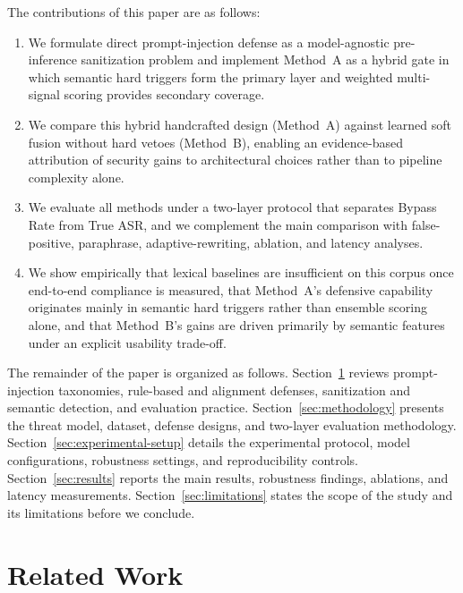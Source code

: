 \documentclass{article}
\begin{document}
The contributions of this paper are as follows:
\begin{enumerate}
  \item We formulate direct prompt-injection defense as a model-agnostic pre-inference sanitization problem and implement Method~A as a hybrid gate in which semantic hard triggers form the primary layer and weighted multi-signal scoring provides secondary coverage.
  \item We compare this hybrid handcrafted design (Method~A) against learned soft fusion without hard vetoes (Method~B), enabling an evidence-based attribution of security gains to architectural choices rather than to pipeline complexity alone.
  \item We evaluate all methods under a two-layer protocol that separates Bypass Rate from True ASR, and we complement the main comparison with false-positive, paraphrase, adaptive-rewriting, ablation, and latency analyses.
  \item We show empirically that lexical baselines are insufficient on this corpus once end-to-end compliance is measured, that Method~A's defensive capability originates mainly in semantic hard triggers rather than ensemble scoring alone, and that Method~B's gains are driven primarily by semantic features under an explicit usability trade-off.
\end{enumerate}

The remainder of the paper is organized as follows.
Section~\ref{sec:related-work} reviews prompt-injection taxonomies, rule-based and alignment defenses, sanitization and semantic detection, and evaluation practice.
Section~\ref{sec:methodology} presents the threat model, dataset, defense designs, and two-layer evaluation methodology.
Section~\ref{sec:experimental-setup} details the experimental protocol, model configurations, robustness settings, and reproducibility controls.
Section~\ref{sec:results} reports the main results, robustness findings, ablations, and latency measurements.
Section~\ref{sec:limitations} states the scope of the study and its limitations before we conclude.



\section{Related Work}
\label{sec:related-work}
\end{document}
